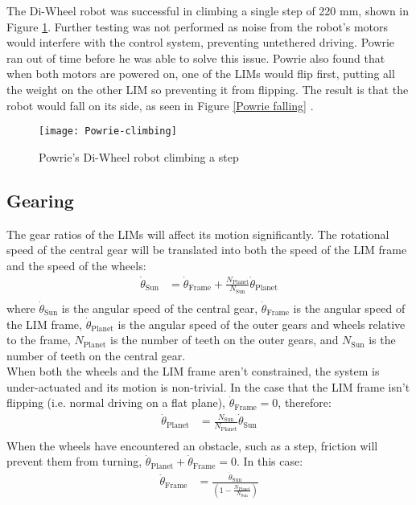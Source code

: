 The Di-Wheel robot was successful in climbing a single step of 220 mm, shown in Figure \ref{Powrie climbing}. Further testing was not performed as noise from the robot's motors would interfere with the control system, preventing untethered driving. Powrie ran out of time before he was able to solve this issue. Powrie also found that when both motors are powered on, one of the LIMs would flip first, putting all the weight on the other LIM so preventing it from flipping. The result is that the robot would fall on its side, as seen in Figure \ref{Powrie falling} \citep{Powrie-2019}.\\


\newpage

\begin{figure}[h]
	\centering
	\texttt{[image: Powrie-climbing]}
	\caption{Powrie's Di-Wheel robot climbing a step \citep{Powrie-2019}}
	\label{Powrie climbing}
\end{figure}

\newpage

\subsection{Gearing} %
The gear ratios of the LIMs will affect its motion significantly. The rotational speed of the central gear will be translated into both the speed of the LIM frame and the speed of the wheels:
\begin{align*}
	\dot{\theta}_{\mathrm{Sun}} &= \dot{\theta}_{\mathrm{Frame}} + \frac{N_\mathrm{Planet}}{N_\mathrm{Sun}}\dot{\theta}_{\mathrm{Planet}} \tag{1}\\
\end{align*}
where $\dot{\theta}_{\mathrm{Sun}}$ is the angular speed of the central gear, $\dot{\theta}_{\mathrm{Frame}}$ is the angular speed of the LIM frame, $\dot{\theta}_{\mathrm{Planet}}$ is the angular speed of the outer gears and wheels relative to the frame, $N_{\mathrm{Planet}}$ is the number of teeth on the outer gears, and $N_\mathrm{Sun}$ is the number of teeth on the central gear.\\

When both the wheels and the LIM frame aren't constrained, the system is under-actuated and its motion is non-trivial. In the case that the LIM frame isn't flipping (i.e. normal driving on a flat plane), $\dot{\theta}_{\mathrm{Frame}} = 0$, therefore:\\
 \begin{align*}
 	\dot{\theta}_{\mathrm{Planet}} &= \frac{N_\mathrm{Sun}}{N_\mathrm{Planet}}\dot{\theta}_{\mathrm{Sun}} \tag{2}\\
 \end{align*}
When the wheels have encountered an obstacle, such as a step, friction will prevent them from turning, $\dot{\theta}_{\mathrm{Planet}} + \dot{\theta}_{\mathrm{Frame}} = 0$. In this case:
\begin{align*}
	\dot{\theta}_{\mathrm{Frame}} &= \frac{\dot{\theta}_{\mathrm{Sun}}}{(1-\frac{N_\mathrm{Planet}}{N_\mathrm{Sun}})} \tag{3}\\
\end{align*}

